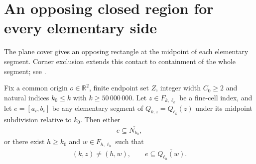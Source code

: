 \section{An opposing closed region for every elementary side}
\label{sec:area_law_elementary_side_opponents}

The plane cover gives an opposing rectangle at the midpoint of
each elementary segment. Corner exclusion extends this contact to
containment of the whole segment; see
\cite[Section~11]{OpenAI2026AreaLaw}.


\begin{lemma}
    \label{thm:area_law_elementary_side_opponent}
    \leanok
    Fix a common origin $o\in\mathbb R^2$, finite endpoint set $Z$,
    integer width $C_0\ge2$ and natural indices $k_0\le k$ with
    $k\ge50\,000\,000$. Let $z\in F_{k,\ell_k}$ be a
    fine-cell index, and let $e=[a_i,b_i]$ be any elementary
    segment of $Q_{k,z}=Q_{\ell_k}(z)$ under its midpoint
    subdivision relative to $k_0$. Then either
    \begin{align}
        e\subseteq\overline{N_{k_0}},
    \end{align}
    or there exist $h\ge k_0$ and $w\in F_{h,\ell_h}$ such that
    \begin{align}
        (k,z)\ne(h,w),\qquad
        e\subseteq\overline{Q_{\ell_h}(w)}.
    \end{align}
\end{lemma}
